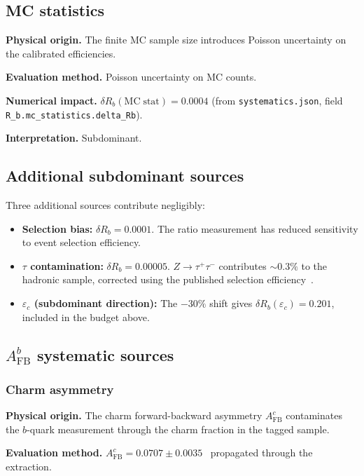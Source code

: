 \documentclass[11pt,a4paper]{article}
\begin{document}
\subsection{MC statistics}
\label{sec:syst_mc_stat}

\textbf{Physical origin.} The finite MC sample size introduces Poisson uncertainty on
the calibrated efficiencies.

\textbf{Evaluation method.} Poisson uncertainty on MC counts.

\textbf{Numerical impact.}
$\delta R_b(\mathrm{MC\;stat}) = 0.0004$
(from \texttt{systematics.json}, field \texttt{R\_b.mc\_statistics.delta\_Rb}).

\textbf{Interpretation.} Subdominant.

\subsection{Additional subdominant sources}
\label{sec:syst_minor}

Three additional sources contribute negligibly:
\begin{itemize}
\item \textbf{Selection bias:}
$\delta R_b = 0.0001$. The ratio measurement has reduced sensitivity
to event selection efficiency.
\item \textbf{$\tau$ contamination:}
$\delta R_b = 0.00005$. $Z \to \tau^+\tau^-$ contributes $\sim 0.3\%$ to the
hadronic sample, corrected using the published selection efficiency~\cite{ALEPH:sigma_had}.
\item \textbf{$\varepsilon_c$ (subdominant direction):} The $-30\%$ shift gives
$\delta R_b(\varepsilon_c) = 0.201$, included in the budget above.
\end{itemize}

\subsection{$A_\mathrm{FB}^b$ systematic sources}
\label{sec:syst_afb}

\subsubsection{Charm asymmetry}
\label{sec:syst_charm_asym}

\textbf{Physical origin.} The charm forward-backward asymmetry $A_\mathrm{FB}^c$ contaminates
the $b$-quark measurement through the charm fraction in the tagged sample.

\textbf{Evaluation method.} $A_\mathrm{FB}^c = 0.0707 \pm 0.0035$~\cite{LEP:EWWG:2005}
propagated through the extraction.
\end{document}
